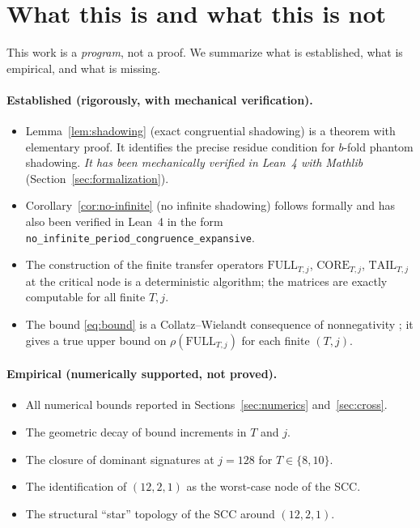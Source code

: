 \documentclass[11pt,a4paper]{article}
\theoremstyle{definition}
\newcommand{\full}{\mathrm{FULL}}
\newcommand{\core}{\mathrm{CORE}}
\newcommand{\tail}{\mathrm{TAIL}}
\newcommand{\spec}{\rho}
\begin{document}
\section{What this is and what this is not}
\label{sec:limits}

This work is a \emph{program}, not a proof. We summarize what is
established, what is empirical, and what is missing.

\paragraph{Established (rigorously, with mechanical verification).}
\begin{itemize}
  \item Lemma~\ref{lem:shadowing} (exact congruential shadowing)
        is a theorem with elementary proof. It identifies the
        precise residue condition for $b$-fold phantom shadowing.
        \emph{It has been mechanically verified in Lean~4 with
        Mathlib} (Section~\ref{sec:formalization}).
  \item Corollary~\ref{cor:no-infinite} (no infinite shadowing)
        follows formally and has also been verified in Lean~4 in
        the form \texttt{no\_infinite\_period\_congruence\_expansive}.
  \item The construction of the finite transfer operators
        $\full_{T,j}$, $\core_{T,j}$, $\tail_{T,j}$ at the critical
        node is a deterministic algorithm; the matrices are
        exactly computable for all finite $T, j$.
  \item The bound \eqref{eq:bound} is a Collatz--Wielandt
        consequence of nonnegativity \cite{lemmensnussbaum}; it
        gives a true upper bound on $\spec(\full_{T,j})$ for each
        finite $(T, j)$.
\end{itemize}

\paragraph{Empirical (numerically supported, not proved).}
\begin{itemize}
  \item All numerical bounds reported in
        Sections~\ref{sec:numerics} and~\ref{sec:cross}.
  \item The geometric decay of bound increments in $T$ and $j$.
  \item The closure of dominant signatures at $j = 128$ for
        $T \in \{8, 10\}$.
  \item The identification of $(12, 2, 1)$ as the worst-case node
        of the SCC.
  \item The structural ``star'' topology of the SCC around
        $(12, 2, 1)$.
\end{itemize}
\end{document}
